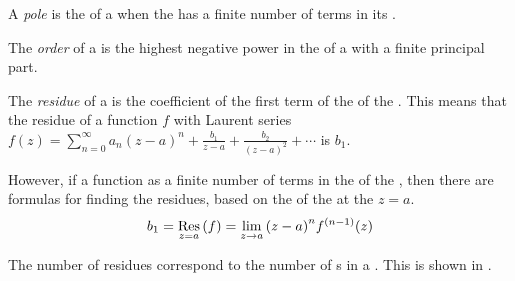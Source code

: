 \begin{definition}[Pole]\label{def:Pole}
  A \emph{pole} is the  of a  when the  has a finite number of terms in its .
\end{definition}

\begin{definition}[Order]\label{def:Pole_Order}
  The \emph{order} of a  is the highest negative power in the  of a  with a finite principal part.
\end{definition}

\begin{definition}[Residue]\label{def:Residue}
  The \emph{residue} of a  is the coefficient of the first term of the  of the .
  This means that the residue of a function $f$ with Laurent series $f(z) = \sum_{n=0}^{\infty} a_{n} {(z-a)}^{n} + \frac{b_{1}}{z-a} + \frac{b_{2}}{{(z-a)}^{2}} + \cdots$ is $b_{1}$.

  However, if a function as a finite number of terms in the  of the , then there are formulas for finding the residues, based on the  of the  at the  $z=a$.
  \begin{equation}\label{eq:Residue}
    b_{1} = \Residue{f}{z=a} = \lim\limits_{z \to a} {(z-a)}^{n} f^{(n-1)}(z)
  \end{equation}

  The number of residues correspond to the number of s in a .
  This is shown in .
\end{definition}

